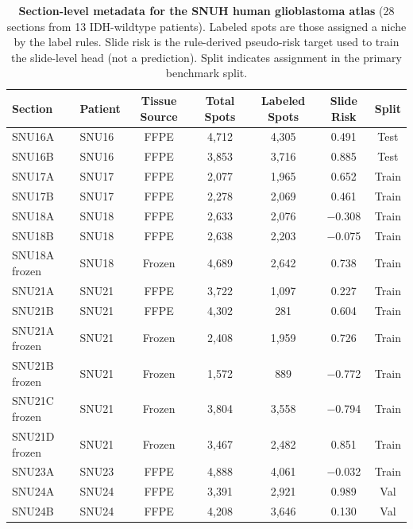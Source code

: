 \documentclass[11pt,letterpaper]{article}
\begin{document}
\clearpage

\begin{table}[H]
\centering
\caption{\textbf{Section-level metadata for the SNUH human glioblastoma atlas} (28 sections from 13 IDH-wildtype patients). Labeled spots are those assigned a niche by the label rules. Slide risk is the rule-derived pseudo-risk target used to train the slide-level head (not a prediction). Split indicates assignment in the primary benchmark split.}
\label{tab:s3}
\footnotesize
\setlength{\tabcolsep}{4.5pt}
\begin{tabular}{llccccc}
\toprule
\textbf{Section} & \textbf{Patient} & \textbf{Tissue Source} & \textbf{Total Spots} & \textbf{Labeled Spots} & \textbf{Slide Risk} & \textbf{Split} \\
\midrule
SNU16A         & SNU16   & FFPE   & 4{,}712 & 4{,}305 & 0.491  & Test \\
SNU16B         & SNU16   & FFPE   & 3{,}853 & 3{,}716 & 0.885  & Test \\
SNU17A         & SNU17   & FFPE   & 2{,}077 & 1{,}965 & 0.652  & Train \\
SNU17B         & SNU17   & FFPE   & 2{,}278 & 2{,}069 & 0.461  & Train \\
SNU18A         & SNU18   & FFPE   & 2{,}633 & 2{,}076 & $-$0.308 & Train \\
SNU18B         & SNU18   & FFPE   & 2{,}638 & 2{,}203 & $-$0.075 & Train \\
SNU18A frozen  & SNU18   & Frozen & 4{,}689 & 2{,}642 & 0.738  & Train \\
SNU21A         & SNU21   & FFPE   & 3{,}722 & 1{,}097 & 0.227  & Train \\
SNU21B         & SNU21   & FFPE   & 4{,}302 & 281     & 0.604  & Train \\
SNU21A frozen  & SNU21   & Frozen & 2{,}408 & 1{,}959 & 0.726  & Train \\
SNU21B frozen  & SNU21   & Frozen & 1{,}572 & 889     & $-$0.772 & Train \\
SNU21C frozen  & SNU21   & Frozen & 3{,}804 & 3{,}558 & $-$0.794 & Train \\
SNU21D frozen  & SNU21   & Frozen & 3{,}467 & 2{,}482 & 0.851  & Train \\
SNU23A         & SNU23   & FFPE   & 4{,}888 & 4{,}061 & $-$0.032 & Train \\
SNU24A         & SNU24   & FFPE   & 3{,}391 & 2{,}921 & 0.989  & Val \\
SNU24B         & SNU24   & FFPE   & 4{,}208 & 3{,}646 & 0.130  & Val \\

\end{tabular}
\end{table}
\end{document}
